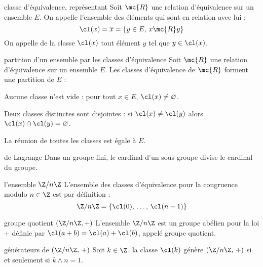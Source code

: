 \begin{adjustwidth}{-3cm}{-3cm}
\begin{definition}{1.59}{classe d'équivalence, représentant}
    Soit $\mc{R}$ une relation d'équivalence sur un ensemble $E$. On appelle  l’ensemble des éléments qui sont en relation avec lui :
    $$\cl(x) = \overline{x} = \{y \in E,\, x \mc{R} y\}$$
On appelle  de la classe $\cl(x)$ tout élément $y$ tel que $y \in \cl(x)$.
\end{definition}

\begin{theoreme}{1.61}{partition d'un ensemble par les classes d'équivalence}
    Soit $\mc{R}$ une relation d'équivalence sur un ensemble $E$. Les classes d’équivalence de $\mc{R}$ forment une partition de $E$ :
    \begin{enumeratebf}
        \item Aucune classe n’est vide : pour tout $x\in E$, $\cl(x) \neq \varnothing$.
        \item Deux classes distinctes sont disjointes : si $\cl(x) \neq \cl(y)$ alors $\cl(x) \cap \cl(y) = \varnothing$.
        \item La réunion de toutes les classes est égale à $E$.
    \end{enumeratebf}
\end{theoreme}

\begin{theoreme}{1.62}{de Lagrange}
    Dans un groupe fini, le cardinal d'un sous-groupe divise le cardinal du groupe.
\end{theoreme}

\begin{definition}{1.65}{l'ensemble $\Z / n\Z$}
    L'ensemble des classes d'équivalence pour la congruence modulo $n \in \Z$ est par définition :
    $$\Z / n\Z = \{ \cl(0),\, \dots,\, \cl(n-1) \}$$
\end{definition}

\begin{theoreme}{1.67}{groupe quotient $(\Z / n\Z, +)$}
    L'ensemble $\Z / n\Z$ est un groupe abélien pour la loi $+$ définie par $\cl(a+b) = \cl(a) + \cl(b)$, appelé groupe quotient.
\end{theoreme}

\begin{theoreme}{1.70}{générateurs de $(\Z /n\Z,\, +)$}
    Soit $k \in \Z$. la classe $\cl(k)$ génère $(\Z /n\Z,\, +)$ si et seulement si $k \wedge n = 1$.
\end{theoreme}


\end{adjustwidth}

